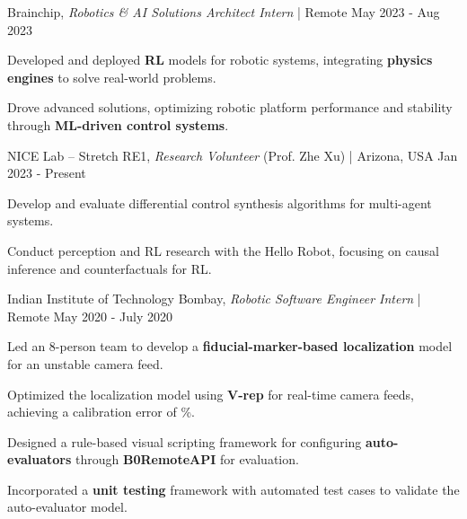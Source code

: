 
\begin{cventries2}


  \cventrynew
    {Brainchip, \textnormal{\textit{Robotics \& AI Solutions Architect Intern} | Remote}} %
    {May 2023 - Aug 2023} %
    {
      \begin{cvitems} %
        \item {Developed and deployed {\bf RL} models for robotic systems, integrating {\bf physics engines} to solve real-world problems.}
        \item {Drove advanced solutions, optimizing robotic platform performance and stability through {\bf ML-driven control systems}.}
      \end{cvitems}
    }



  \cventrynew
    {NICE Lab -- Stretch RE1, \textnormal{\textit{Research Volunteer} (Prof. Zhe Xu) | Arizona, USA}} %
    {Jan 2023 - Present} %
    {
      \begin{cvitems} %
        \item {Develop and evaluate differential control synthesis algorithms for multi-agent systems.} 
        \item {Conduct perception and RL research with the Hello Robot, focusing on causal inference and counterfactuals for RL.}
      \end{cvitems}
      }


  \cventrynew
    {Indian Institute of Technology Bombay, \textnormal{\textit{Robotic Software Engineer Intern} | Remote}} %
    {May 2020 - July 2020} %
    {
      \begin{cvitems} %
        \item {Led an 8-person team to develop a {\bf fiducial-marker-based localization} model for an unstable camera feed.}
        \item {Optimized the localization model using {\bf V-rep} for real-time camera feeds, achieving a calibration error of \%.}
        \item {Designed a rule-based visual scripting framework for configuring {\bf auto-evaluators} through {\bf B0RemoteAPI} for evaluation.}
        \item {Incorporated a {\bf unit testing} framework with automated test cases to validate the auto-evaluator model.}
      \end{cvitems}
    }


\end{cventries2}
